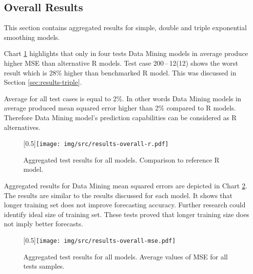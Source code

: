         \subsection{Overall Results} \label{sec:overall}
        This section contains aggregated results for simple, double and triple exponential smoothing models.

        Chart \ref{img:results-overall-r} highlights that only in four tests Data Mining models in average produce
        higher MSE than alternative R models. Test case 200\,--\,12(12) shows the worst result which is 28\%
        higher than benchmarked R model. This was discussed in Section \ref{sec:results-triple}.

        Average for all test cases is equal to 2\%. In other words Data Mining models in average produced mean
        squared error higher than 2\% compared to R models. Therefore Data Mining model's prediction capabilities
        can be considered as R alternatives.

        \begin{figure}[H]
            \begin{center}
                \scalebox{0.65}[0.5]{\texttt{[image: img/src/results-overall-r.pdf]}}
                \caption{Aggregated test results for all models. Comparison to reference R model.}
                \label{img:results-overall-r}
            \end{center}
        \end{figure}

        Aggregated results for Data Mining mean squared errors are depicted in Chart \ref{img:results-overall-mse}. The
        results are similar to the results discussed for each model. It shows that longer training set does not
        improve forecasting accuracy. Further research could identify ideal size of training set. These tests
        proved that longer training size does not imply better forecasts.

        \begin{figure}[H]
            \begin{center}
                \scalebox{0.65}[0.5]{\texttt{[image: img/src/results-overall-mse.pdf]}}
                \caption{Aggregated test results for all models. Average values of MSE for all tests samples.}
                \label{img:results-overall-mse}
            \end{center}
        \end{figure}

